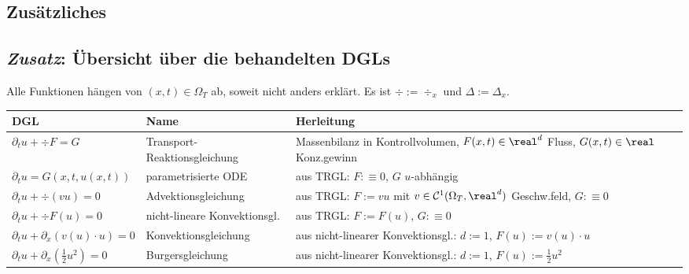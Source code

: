 \begin{landscape}
    \section{%
        Zusätzliches%
    }

    \subsection{%
        \emph{Zusatz}: Übersicht über die behandelten DGLs%
    }

    \footnotesize

    Alle Funktionen hängen von $(x, t) \in \Omega_T$ ab, soweit nicht anders erklärt.
    Es ist $\div := \div_x$ und $\Delta := \Delta_x$.

    \renewcommand*{\arraystretch}{1.2}
    \begin{tabular}{p{65mm}p{55mm}p{128mm}}
        \toprule

        \textbf{DGL} & \textbf{Name} & \textbf{Herleitung}\\

        \midrule

        $\partial_t u + \div F = G$&
        Transport-Reaktionsgleichung&
        Massenbilanz in Kontrollvolumen,
        $F(x,t) \in \real^d$ Fluss, $G(x,t) \in \real$ Konz.gewinn\\

        $\partial_t u = G(x, t, u(x,t))$&
        parametrisierte ODE&
        aus TRGL: $F :\equiv 0$, $G$ $u$-abhängig\\

        $\partial_t u + \div(vu) = 0$&
        Advektionsgleichung&
        aus TRGL: $F := vu$ mit $v \in \C^1(\Omega_T, \real^d)$ Geschw.feld, $G :\equiv 0$\\

        \midrule

        $\partial_t u + \div F(u) = 0$&
        nicht-lineare Konvektionsgl.&
        aus TRGL: $F := F(u)$, $G :\equiv 0$\\

        $\partial_t u + \partial_x (v(u) \cdot u) = 0$&
        Konvektionsgleichung&
        aus nicht-linearer Konvektionsgl.: $d := 1$, $F(u) := v(u) \cdot u$\\

        $\partial_t u + \partial_x(\frac{1}{2} u^2) = 0$&
        Burgersgleichung&
        aus nicht-linearer Konvektionsgl.: $d := 1$, $F(u) := \frac{1}{2} u^2$\\


\end{tabular}
\end{landscape}
